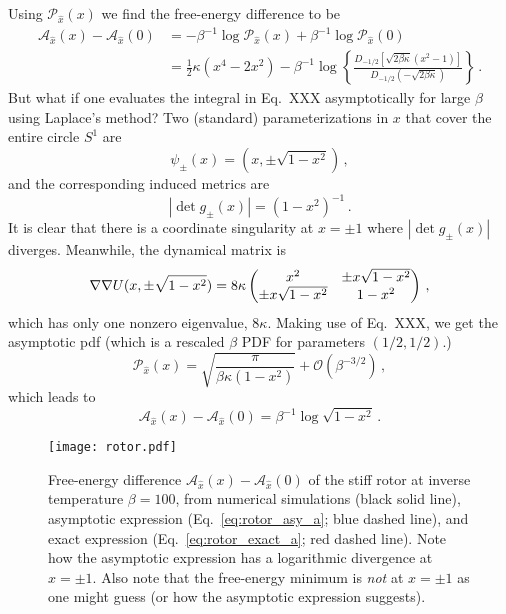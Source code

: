Using $\mathcal{P}_{\hat{x}}(x)$ we find the free-energy difference to be
\begin{equation}
\begin{aligned}\label{eq:rotor_exact_a}
  \mathcal{A}_{\hat{x}}(x) - \mathcal{A}_{\hat{x}}(0) &= -\beta^{-1}\log{\mathcal{P}_{\hat{x}}(x)} +\beta^{-1}\log{\mathcal{P}_{\hat{x}}(0)}\\
                                                      &= \tfrac{1}{2}\kappa(x^4 - 2x^2) - \beta^{-1}\log\left\{\frac{D_{-1/2}\left[\sqrt{2\beta\kappa}(x^2-1)\right]}{D_{-1/2}\left(-\sqrt{2\beta\kappa}\right)}\right\}\,.
\end{aligned}
\end{equation}
But what if one evaluates the integral in Eq.~XXX asymptotically for large $\beta$ using Laplace's method?
Two (standard) parameterizations in $x$ that cover the entire circle $S^1$ are
\begin{equation}
  \psi_{\pm}(x) = (x, \pm\sqrt{1 - x^2})\,,
\end{equation}
and the corresponding induced metrics are
\begin{equation}
  |\det g_{\pm}(x)| = (1-x^2)^{-1}\,.
\end{equation}
It is clear that there is a coordinate singularity at $x = \pm 1$ where $|\det g_{\pm}(x)|$ diverges.
Meanwhile, the dynamical matrix is
\begin{equation}
  \nabla\nabla U(x, \pm\sqrt{1-x^2}) = 8\kappa
  \begin{pmatrix}
    x^2 & \pm x\sqrt{1-x^2}\\
    \pm x\sqrt{1-x^2} & 1-x^2
  \end{pmatrix}\,,
\end{equation}
which has only one nonzero eigenvalue, $8\kappa$.
Making use of Eq.~XXX, we get the asymptotic \ac{pdf} (which is a rescaled $\beta$ PDF for parameters $(1/2, 1/2)$.)
\begin{equation}
  \mathcal{P}_{\hat{x}}(x) = \sqrt{\frac{\pi}{\beta\kappa(1-x^2)}} + \mathcal{O}(\beta^{-3/2})\,,
\end{equation}
which leads to
\begin{equation}\label{eq:rotor_asy_a}
  \mathcal{A}_{\hat{x}}(x) - \mathcal{A}_{\hat{x}}(0) = \beta^{-1}\log\sqrt{1-x^2}\,.
\end{equation}
\begin{figure}
  \begin{center}
    \texttt{[image: rotor.pdf]}
  \end{center}
  \caption{
    Free-energy difference $\mathcal{A}_{\hat{x}}(x) - \mathcal{A}_{\hat{x}}(0)$ of the stiff rotor at inverse temperature $\beta = 100$, from numerical simulations (black solid line), asymptotic expression (Eq.~\ref{eq:rotor_asy_a}; blue dashed line), and exact expression (Eq.~\ref{eq:rotor_exact_a}; red dashed line).
    Note how the asymptotic expression has a logarithmic divergence at $x = \pm 1$.
    Also note that the free-energy minimum is \emph{not} at $x = \pm 1$ as one might guess (or how the asymptotic expression suggests).
  }
  \label{fig:rotor}
\end{figure}

